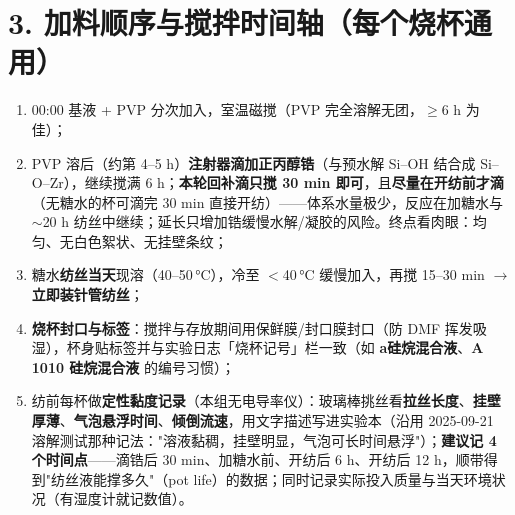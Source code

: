 \documentclass[a4paper, 10pt]{ctexart}
\begin{document}
\section*{3. 加料顺序与搅拌时间轴（每个烧杯通用）}
\begin{enumerate}[itemsep=2pt]
  \item 00:00 基液 + PVP 分次加入，室温磁搅（PVP 完全溶解无团，$\geq$6 h 为佳）；
  \item PVP 溶后（约第 4--5 h）\textbf{注射器滴加正丙醇锆}（与预水解 Si--OH 结合成 Si--O--Zr），继续搅满 6 h；\textbf{本轮回补滴只搅 30 min 即可}，且\textbf{尽量在开纺前才滴}（无糖水的杯可滴完 30 min 直接开纺）——体系水量极少，反应在加糖水与 $\sim$20 h 纺丝中继续；延长只增加锆缓慢水解/凝胶的风险。终点看肉眼：均匀、无白色絮状、无挂壁条纹；
  \item 糖水\textbf{纺丝当天}现溶（40--50\,°C），冷至 $<$40\,°C 缓慢加入，再搅 15--30 min $\rightarrow$ \textbf{立即装针管纺丝}；
  \item \textbf{烧杯封口与标签}：搅拌与存放期间用保鲜膜/封口膜封口（防 DMF 挥发吸湿），杯身贴标签并与实验日志「烧杯记号」栏一致（如 \textbf{a硅烷混合液}、\textbf{A 1010 硅烷混合液} 的编号习惯）；
  \item 纺前每杯做\textbf{定性黏度记录}（本组无电导率仪）：玻璃棒挑丝看\textbf{拉丝长度}、\textbf{挂壁厚薄}、\textbf{气泡悬浮时间}、\textbf{倾倒流速}，用文字描述写进实验本（沿用 2025-09-21 溶解测试那种记法："溶液黏稠，挂壁明显，气泡可长时间悬浮"）；\textbf{建议记 4 个时间点}——滴锆后 30 min、加糖水前、开纺后 6 h、开纺后 12 h，顺带得到"纺丝液能撑多久"（pot life）的数据；同时记录实际投入质量与当天环境状况（有湿度计就记数值）。
\end{enumerate}
\end{document}
